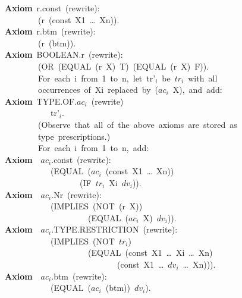 \documentclass[10pt]{book}
\newenvironment{pubasis}{\begin{flushleft}}{\end{flushleft}}
\newcommand{\axiomordefinition}[1]{\vspace{6pt}\Large\textsf{\textbf{#1}}\normalsize}
\begin{document}
\begin{pubasis}
\axiomordefinition{Axiom}~r.const~(rewrite):\\
~~~~~~~~(r~(const~X1~\ldots{}~Xn)).\\

\axiomordefinition{Axiom}~r.btm~(rewrite):\\
~~~~~~~~(r~(btm)).\\

\axiomordefinition{Axiom}~BOOLEAN.r~(rewrite):\\
~~~~~~~~(OR~(EQUAL~(r~X)~T)~(EQUAL~(r~X)~F)).\\

~~~~~~~~For~each~i~from~1~to~n,~let~tr'$_{i}$~be~$tr_{i}$~with~all\\
~~~~~~~~occurrences~of~Xi~replaced~by~($ac_{i}$~X),~and~add:\\

\axiomordefinition{Axiom}~TYPE.OF.$ac_{i}$~(rewrite)\\
~~~~~~~~~~~tr'$_{i}$.\\

~~~~~~~~(Observe~that~all~of~the~above~axioms~are~stored~as\\
~~~~~~~~type~prescriptions.)\\

~~~~~~~~For~each~i~from~1~to~n,~add:\\

\axiomordefinition{Axiom}~~$ac_{i}$.const~(rewrite):\\
~~~~~~~~~~~(EQUAL~($ac_{i}$~(const~X1~\ldots{}~Xn))\\
~~~~~~~~~~~~~~~~~~(IF~$tr_{i}$~Xi~$dv_{i}$)).\\

\axiomordefinition{Axiom}~~$ac_{i}$.Nr~(rewrite):\\
~~~~~~~~~~~(IMPLIES~(NOT~(r~X))\\
~~~~~~~~~~~~~~~~~~~~(EQUAL~($ac_{i}$~X)~$dv_{i}$)).\\

\axiomordefinition{Axiom}~~$ac_{i}$.TYPE.RESTRICTION~(rewrite):\\
~~~~~~~~~~~(IMPLIES~(NOT~$tr_{i}$)\\
~~~~~~~~~~~~~~~~~~~~(EQUAL~(const~X1~\ldots{}~Xi~\ldots{}~Xn)\\
~~~~~~~~~~~~~~~~~~~~~~~~~~~(const~X1~\ldots{}~$dv_{i}$~\ldots{}~Xn))).\\

\axiomordefinition{Axiom}~~$ac_{i}$.btm~(rewrite):\\
~~~~~~~~~~~(EQUAL~($ac_{i}$~(btm))~$dv_{i}$).\\


\end{pubasis}
\end{document}
